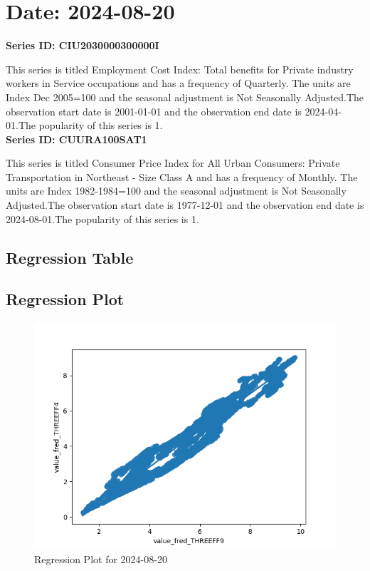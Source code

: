 \section{Date: 2024-08-20}
\noindent \textbf{Series ID: CIU2030000300000I} 

\noindent This series is titled Employment Cost Index: Total benefits for Private industry workers in Service occupations and has a frequency of Quarterly. The units are Index Dec 2005=100 and the seasonal adjustment is Not Seasonally Adjusted.The observation start date is 2001-01-01 and the observation end date is 2024-04-01.The popularity of this series is 1. \\ 

\noindent \textbf{Series ID: CUURA100SAT1} 

\noindent This series is titled Consumer Price Index for All Urban Consumers: Private Transportation in Northeast - Size Class A and has a frequency of Monthly. The units are Index 1982-1984=100 and the seasonal adjustment is Not Seasonally Adjusted.The observation start date is 1977-12-01 and the observation end date is 2024-08-01.The popularity of this series is 1. \\ 

\subsection{Regression Table}


\subsection{Regression Plot}
\begin{figure}
\centering
\includegraphics[scale = 0.9]{plots/plot_2024-08-20.png}
\caption{Regression Plot for 2024-08-20}
\end{figure}
\newpage
